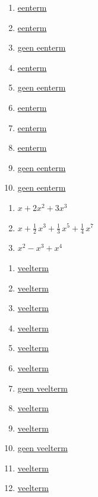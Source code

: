 \documentclass{ximera}
\begin{document}
\begin{Antwoord} \label{antw1.1}
\begin{enumerate}

\item
\hyperlink{oef1.1}{eenterm}
\item
\hyperlink{oef1.1}{eenterm}
\item
\hyperlink{oef1.1}{geen eenterm}
\item
\hyperlink{oef1.1}{eenterm}
\item
\hyperlink{oef1.1}{geen eenterm}
\item
\hyperlink{oef1.1}{eenterm}
\item\hyperlink{oef1.1}{eenterm}
\item
\hyperlink{oef1.1}{eenterm}
\item
\hyperlink{oef1.1}{geen eenterm}
\item
\hyperlink{oef1.1}{geen eenterm}
\end{enumerate}
\end{Antwoord}

\begin{Antwoord} \label{antw1.2}
\begin{enumerate}
\item
\hyperlink{oef1.2}{$x + 2x^2 + 3x^3$}
\item
\hyperlink{oef1.2}{$x + \frac{1}{2}\,x^3 + \frac{1}{3}\,x^5 + \frac{1}{4}\,x^7$}
\item
\hyperlink{oef1.2}{$x^2 - x^3 + x^4$}
\end{enumerate}
\end{Antwoord}

\begin{Antwoord} \label{antw1.3}
\begin{enumerate}
\item
\hyperlink{oef1.3}{veelterm}
\item
\hyperlink{oef1.3}{veelterm}
\item
\hyperlink{oef1.3}{veelterm}
\item
\hyperlink{oef1.3}{veelterm}
\item
\hyperlink{oef1.3}{veelterm}
\item
\hyperlink{oef1.3}{veelterm}
\item
\hyperlink{oef1.3}{geen veelterm}
\item
\hyperlink{oef1.3}{veelterm}
\item
\hyperlink{oef1.3}{veelterm}
\item
\hyperlink{oef1.3}{geen veelterm}
\item
\hyperlink{oef1.3}{veelterm}
\item
\hyperlink{oef1.3}{veelterm}
\end{enumerate}
\setcounter{enumi}{4}
\end{Antwoord}
\end{document}

